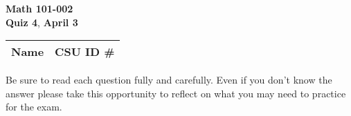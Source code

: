 \documentclass[12pt]{exam}
\newcommand{\class}{Math 101-002} %
\newcommand{\examnum}{Quiz 4} %
\newcommand{\examdate}{April 3} %
\begin{document}
\pagestyle{plain}
\thispagestyle{empty}

\noindent
\textbf{\class}\\
\textbf{\examnum}, \textbf{\examdate} \\



\setlength{\tabcolsep}{3.5cm} %
\renewcommand{\arraystretch}{1.5}
\setlength\extrarowheight{1cm}
\begin{tabular}{ |c|c| } 
 \hline
 Name   & CSU ID \#  \\ 
 \hline
\end{tabular}
\vspace{10pt}

Be sure to read each question fully and carefully. Even if you don't know the answer please take this opportunity to reflect on what you may need to practice for the exam.
\end{document}
